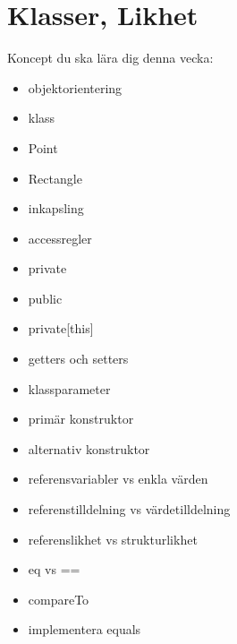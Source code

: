 \chapter{Klasser, Likhet}\label{chapter:W06}
Koncept du ska lära dig denna vecka:
\begin{multicols}{2}\begin{itemize}[nosep,label={$\square$},leftmargin=*]
\item objektorientering
\item klass
\item Point
\item Rectangle
\item inkapsling
\item accessregler
\item private
\item public
\item private[this]
\item getters och setters
\item klassparameter
\item primär konstruktor
\item alternativ konstruktor
\item referensvariabler vs enkla värden
\item referenstilldelning vs värdetilldelning
\item referenslikhet vs strukturlikhet
\item eq vs ==
\item compareTo
\item implementera equals\end{itemize}\end{multicols}

